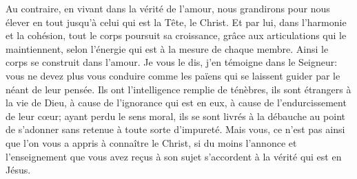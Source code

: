 Au contraire, en vivant dans la vérité de l’amour,
	nous grandirons pour nous élever en tout jusqu’à celui qui est la Tête, le Christ.
Et par lui, dans l’harmonie et la cohésion, tout le corps poursuit sa croissance,
	grâce aux articulations qui le maintiennent,
	selon l’énergie qui est à la mesure de chaque membre.
Ainsi le corps se construit dans l’amour.
Je vous le dis, j’en témoigne dans le Seigneur:
	vous ne devez plus vous conduire comme les païens
	qui se laissent guider par le néant de leur pensée.
Ils ont l’intelligence remplie de ténèbres, ils sont étrangers à la vie de Dieu,
	à cause de l’ignorance qui est en eux, à cause de l’endurcissement de leur cœur;
	ayant perdu le sens moral, ils se sont livrés à la débauche
	au point de s’adonner sans retenue à toute sorte d’impureté.
Mais vous, ce n’est pas ainsi que l’on vous a appris à connaître le Christ,
	si du moins l’annonce et l’enseignement que vous avez reçus à son sujet
	s’accordent à la vérité qui est en Jésus.
